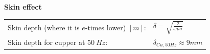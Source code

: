 \textbf{\\ \\ Skin effect\\}
\begin{tabular}{ll}
	Skin depth (where it is $e$-times lower) $[m]$: & \(\displaystyle \delta = \sqrt{\frac{2}{\omega \mu\sigma}} \) \\
	Skin depth for cupper at $50~Hz$: & \(\displaystyle \delta_{Cu,50Hz} \approx 9mm \)
\end{tabular}

